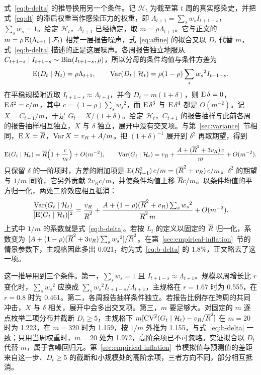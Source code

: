 式~\eqref{eq:b-delta} 的推导换用另一个条件。记 $\mathcal H_t$ 为截至第 $t$ 周的真实感染史，并把式~\eqref{eq:dt} 的滞后权重当作感染压力的权重，即 $\Lambda_{t+1}=\sum_s w_sI_{t+1-s}$，$\sum_s w_s=1$。给定 $\mathcal H_t$，$\Lambda_{t+1}$ 已经确定，取 $m=\rho\Lambda_{t+1}$。它与正文的 $m=\rho\operatorname{E}(\Lambda_{t+1}\mid\mathcal F_t)$ 相差一层报告噪声，式~\eqref{eq:affine} 的拟合又以 $D_t$ 代替 $m$，式~\eqref{eq:b-delta} 描述的正是这层噪声。各周报告独立地服从 $C_{t+1-s}\mid I_{t+1-s}\sim\operatorname{Bin}(I_{t+1-s},\rho)$，所以分母的条件均值与条件方差为
\begin{equation*}
  \operatorname{E}(D_t\mid\mathcal H_t)=\rho\Lambda_{t+1},\qquad
  \operatorname{Var}(D_t\mid\mathcal H_t)=\rho(1-\rho)\sum_s {w_s}^2I_{t+1-s}.
\end{equation*}
在平稳规模附近取 $I_{t+1-s}\approx\Lambda_{t+1}$，并令 $D_t=m(1+\delta)$，则 $\operatorname{E}\delta=0$，$\operatorname{E}\delta^2=c/m$，其中 $c=(1-\rho)\sum_s {w_s}^2$，而 $\operatorname{E}\delta^3$ 与 $\operatorname{E}\delta^4$ 都是 $O(m^{-2})$。记 $X=C_{t+1}/m$，于是 $G_t=X/(1+\delta)$。给定 $\mathcal H_t$，$C_{t+1}$ 的报告抽样与此前各周的报告抽样相互独立，$X$ 与 $\delta$ 独立，展开中没有交叉项。与第~\ref{sec:variance}~节相同，$\operatorname{E} X=\overline{R}$，$\operatorname{Var} X=v_R+A/m$。把 $(1+\delta)^{-1}$ 展开到 $\delta^2$ 再取期望，得到
\begin{equation*}
  \operatorname{E}(G_t\mid\mathcal H_t)=\overline{R}\Bigl(1+\frac cm\Bigr)+O(m^{-2}),\qquad
  \operatorname{Var}(G_t\mid\mathcal H_t)=v_R+\frac{A+(\overline{R}^2+3v_R)\,c}{m}+O(m^{-2}).
\end{equation*}
只保留 $\delta$ 的一阶项时，方差的附加项是 $\operatorname{E}(R_{t+1}^2)\,c/m=(\overline{R}^2+v_R)\,c/m$。$\delta^2$ 的期望与 $1/m$ 同阶，它另外贡献 $2v_Rc/m$，并使条件均值上移 $\overline{R} c/m$。以条件均值的平方归一化，两处二阶效应相互抵消：
\begin{equation*}
  \frac{\operatorname{Var}(G_t\mid\mathcal H_t)}{[\operatorname{E}(G_t\mid\mathcal H_t)]^2}
  =\frac{v_R}{\overline{R}^2}+\frac{A+(1-\rho)(\overline{R}^2+v_R)\sum_s {w_s}^2}{\overline{R}^2\,m}+O(m^{-2}).
\end{equation*}
上式中 $1/m$ 的系数就是式~\eqref{eq:b-delta}。若按 $L_t$ 的定义以固定的 $\overline{R}$ 归一化，系数变为 $[A+(1-\rho)(\overline{R}^2+3v_R)\sum_s {w_s}^2]/\overline{R}^2$。在第~\ref{sec:empirical-inflation}~节的情景参数下，主规格因此多出 0.021，约为式~\eqref{eq:b-delta} 的 1.8\%，正文略去了这一项。

这一推导用到三个条件。第一，$\sum_s w_s=1$ 且 $I_{t+1-s}\approx\Lambda_{t+1}$。规模以周增长比 $r$ 变化时，$\sum_s {w_s}^2$ 应换成 $\sum_s {w_s}^2I_{t+1-s}/\Lambda_{t+1}$，主规格在 $r=1.67$ 时为 0.555，在 $r=0.8$ 时为 0.461。第二，各周报告抽样条件独立。若报告比例存在跨周的共同冲击，$X$ 与 $\delta$ 相关，展开中会多出交叉项。第三，$m$ 要足够大。对固定的 $m$ 逐点枚举二项分布并截断 $D_t\geq5$，主规格下 $m[\operatorname{CV}^2(G_t\mid\mathcal H_t)-v_R/\overline{R}^2]$ 在 $m=20$ 时为 1.223，在 $m=320$ 时为 1.159，按 $1/m$ 外推为 1.155，与式~\eqref{eq:b-delta} 一致；只用当周权重时，$m=20$ 处为 1.972，高阶余项已不可忽略。实证拟合以 $D_t$ 代替 $m$，属于含噪回归元。第~\ref{sec:empirical-inflation}~节模拟值与预测值的差距来自这一步、$D_t\geq5$ 的截断和小规模处的高阶余项，三者方向不同，部分相互抵消。

